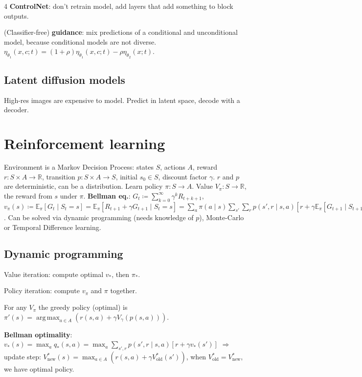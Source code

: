 \documentclass[11pt,landscape,a4paper,fleqn]{article}
\newcommand{\E}{\mathbb{E}}
\newcommand{\R}{\mathbb{R}}
\DeclareMathOperator*{\argmax}{arg\,max}
\begin{document}
\begin{multicols*}{4}
\textbf{ControlNet}: don't retrain model, add layers that add something to block outputs.

(Classifier-free) \textbf{guidance}: mix predictions of a conditional and unconditional model,
because conditional models are not diverse.
$\eta_{\theta_1}(x, c; t) = (1 + \rho)\eta_{\theta_1}(x, c; t) - \rho \eta_{\theta_2}(x; t)$.

\subsection{Latent diffusion models}

High-res images are expensive to model.
Predict in latent space, decode with a decoder.

\section{Reinforcement learning}

Environment is a Markov Decision Process:
states $S$, actions $A$,
reward $r : S \times A \to \R$,
transition $p: S \times A \to S$,
initial $s_0 \in S$,
discount factor $\gamma$.
$r$ and $p$ are deterministic, can be a distribution.
Learn policy $\pi : S \to A$.
Value $V_\pi: S \to \R$, the reward from $s$ under $\pi$.
\textbf{Bellman eq.}: $G_t \coloneqq \sum_{k = 0}^\infty \gamma^k R_{t + k + 1},$
$v_\pi(s) \coloneqq \E_\pi[G_t \mid S_t = s]
= \E_\pi[R_{t+1} + \gamma G_{t+1} \mid S_t = s]
= \sum_a \pi(a \mid s) \sum_{s'} \sum_r p(s', r \mid s, a)[r + \gamma \E_\pi[G_{t+1} \mid S_{t+1} = s']]
= \sum_a \pi(a \mid s) \sum_{s', r} p(s', r \mid s, a)[r + \gamma v_\pi(s')]]$.
Can be solved via dynamic programming (needs knowledge of $p$),
Monte-Carlo or Temporal Difference learning.

\subsection{Dynamic programming}

Value iteration: compute optimal $v_*$, then $\pi_*$.

Policy iteration: compute $v_\pi$ and $\pi$ together.

For any $V_\pi$ the greedy policy (optimal) is
$\pi'(s) = \argmax_{a \in A}(r(s, a) + \gamma V_\gamma(p(s, a)))$.

\textbf{Bellman optimality}: $v_*(s) = \max_a q_*(s, a)
= \max_a \sum_{s', r} p(s', r \mid s, a)[r + \gamma v_*(s')]$
$ \Rightarrow $ update step:
$V_{\mathrm{new}}^*(s) = \max_{a \in A} (r(s, a) + \gamma V_{\mathrm{old}}^*(s'))$,
when $V_{\mathrm{old}}^* = V_{\mathrm{new}}^*$, we have optimal policy.


\end{multicols*}
\end{document}
